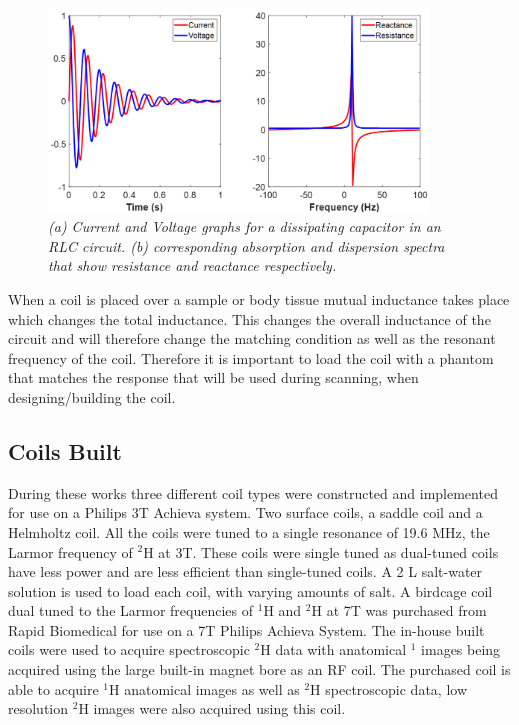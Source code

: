 \begin{figure}
    \centering
    \includegraphics[width=0.9\textwidth]{Figures/Theory/VI.png}
    \caption{\textit{(a) Current and Voltage graphs for a dissipating capacitor in an RLC circuit. (b) corresponding absorption and dispersion spectra that show resistance and reactance respectively.}}
    \label{fig:theory:VI}
\end{figure}

When a coil is placed over a sample or body tissue mutual inductance takes place which changes the total inductance. This changes the overall inductance of the circuit and will therefore change the matching condition as well as the resonant frequency of the coil. Therefore it is important to load the coil with a phantom that matches the response that will be used during scanning, when designing/building the coil. 

\subsection{Coils Built}

During these works three different coil types were constructed and implemented for use on a Philips 3T Achieva system. Two surface coils, a saddle coil and a Helmholtz coil. All the coils were tuned to a single resonance of 19.6 MHz, the Larmor frequency of $^2$H at 3T. These coils were single tuned as dual-tuned coils have less power and are less efficient than single-tuned coils. A 2 L salt-water solution is used to load each coil, with varying amounts of salt. A birdcage coil dual tuned to the Larmor frequencies of $^1$H and $^2$H at 7T was purchased from Rapid Biomedical for use on a 7T Philips Achieva System. The in-house built coils were used to acquire spectroscopic $^2$H data with anatomical $^1$ images being acquired using the large built-in magnet bore as an \ac{RF} coil. The purchased coil is able to acquire $^1$H anatomical images as well as $^2$H spectroscopic data, low resolution $^2$H images were also acquired using this coil.

